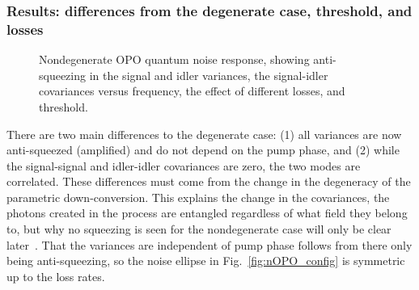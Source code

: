 \subsubsection{Results: differences from the degenerate case, threshold, and losses}

\begin{figure}
	\centering
	\caption{Nondegenerate OPO quantum noise response, showing anti-squeezing in the signal and idler variances, the signal-idler covariances versus frequency, the effect of different losses, and threshold.}
	\label{fig:nOPO_variances}
\end{figure}

There are two main differences to the degenerate case: (1) all variances are now anti-squeezed (amplified) and do not depend on the pump phase, and (2) while the signal-signal and idler-idler covariances are zero, the two modes are correlated. These differences must come from the change in the degeneracy of the parametric down-conversion.
This explains the change in the covariances, the photons created in the process are entangled regardless of what field they belong to, but why no squeezing is seen for the nondegenerate case will only be clear later~\cite{}.
That the variances are independent of pump phase follows from there only being anti-squeezing, so the noise ellipse in Fig.~\ref{fig:nOPO_config} is symmetric up to the loss rates.

